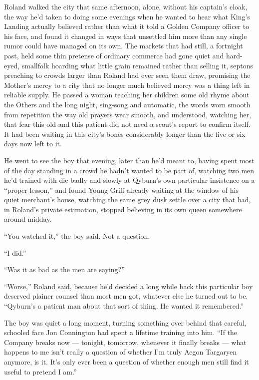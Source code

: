 \sceneBreak

Roland walked the city that same afternoon, alone, without his captain’s cloak, the way he’d taken to doing some evenings when he wanted to hear what King’s Landing actually believed rather than what it told a Golden Company officer to his face, and found it changed in ways that unsettled him more than any single rumor could have managed on its own. The markets that had still, a fortnight past, held some thin pretense of ordinary commerce had gone quiet and hard-eyed, smallfolk hoarding what little grain remained rather than selling it, septons preaching to crowds larger than Roland had ever seen them draw, promising the Mother’s mercy to a city that no longer much believed mercy was a thing left in reliable supply. He passed a woman teaching her children some old rhyme about the Others and the long night, sing-song and automatic, the words worn smooth from repetition the way old prayers wear smooth, and understood, watching her, that fear this old and this patient did not need a scout’s report to confirm itself. It had been waiting in this city’s bones considerably longer than the five or six days now left to it.

\sceneBreak

He went to see the boy that evening, later than he’d meant to, having spent most of the day standing in a crowd he hadn’t wanted to be part of, watching two men he’d trained with die badly and slowly at Qyburn’s own particular insistence on a “proper lesson,” and found Young Griff already waiting at the window of his quiet merchant’s house, watching the same grey dusk settle over a city that had, in Roland’s private estimation, stopped believing in its own queen somewhere around midday.

“You watched it,” the boy said. Not a question.

“I did.”

“Was it as bad as the men are saying?”

“Worse,” Roland said, because he’d decided a long while back this particular boy deserved plainer counsel than most men got, whatever else he turned out to be. “Qyburn’s a patient man about that sort of thing. He wanted it remembered.”

The boy was quiet a long moment, turning something over behind that careful, schooled face Jon Connington had spent a lifetime training into him. “If the Company breaks now — tonight, tomorrow, whenever it finally breaks — what happens to me isn’t really a question of whether I’m truly Aegon Targaryen anymore, is it. It’s only ever been a question of whether enough men still find it useful to pretend I am.”

